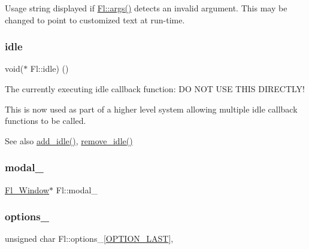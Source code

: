 Usage string displayed if \hyperlink{class_fl_a57d6ddce4c9669fef6b8973b5cc916bd}{Fl\+::args()} detects an invalid argument. This may be changed to point to customized text at run-\/time. \mbox{\label{class_fl_a7ffcc1f5d8fe8c2b77590f537be97ac6}} 
\subsubsection{\texorpdfstring{idle}{idle}}
{\footnotesize\ttfamily void($\ast$ Fl\+::idle) ()\hspace{0.3cm}{\ttfamily [static]}}

The currently executing idle callback function\+: DO N\+OT U\+SE T\+H\+IS D\+I\+R\+E\+C\+T\+L\+Y!

This is now used as part of a higher level system allowing multiple idle callback functions to be called. \begin{DoxySeeAlso}{See also}
\hyperlink{class_fl_a42d6e5121c18ed1a422fbb02993cf900}{add\+\_\+idle()}, \hyperlink{class_fl_acd760509598e72ba9a1e725fdd1a66c9}{remove\+\_\+idle()} 
\end{DoxySeeAlso}
\mbox{\label{class_fl_ad309d170c817507e5c5f667832ea68fd}} 
\subsubsection{\texorpdfstring{modal\+\_\+}{modal\_}}
{\footnotesize\ttfamily \hyperlink{class_fl___window}{Fl\+\_\+\+Window}$\ast$ Fl\+::modal\+\_\+\hspace{0.3cm}{\ttfamily [static]}}

\mbox{\label{class_fl_a69ba56858693d9c4848467a3a6ed4473}} 
\subsubsection{\texorpdfstring{options\+\_\+}{options\_}}
{\footnotesize\ttfamily unsigned char Fl\+::options\+\_\+\mbox{[}\hyperlink{class_fl_a43e6e0bbbc03cad134d928d4edd48d1da220ebf62255fc47e5b5f213b410e2bc5}{O\+P\+T\+I\+O\+N\+\_\+\+L\+A\+ST}\mbox{]}\hspace{0.3cm}{\ttfamily [static]}, {\ttfamily [private]}}

